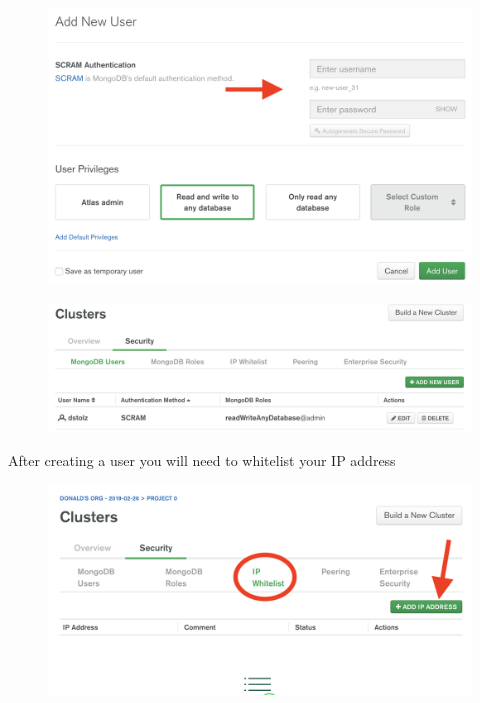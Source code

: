 \documentclass{42-en}
\begin{document}
\begin{figure}[H]
    \begin{center}
        \includegraphics[width=14cm]{WEB/mongo_6.png}
    \end{center}
\end{figure}

\begin{figure}[H]
    \begin{center}
        \includegraphics[width=14cm]{WEB/mongo_7.png}
    \end{center}
\end{figure}

\newpage
After creating a user you will need to whitelist your IP address
\begin{figure}[H]
    \begin{center}
        \includegraphics[width=14cm]{WEB/mongo_8.png}
    \end{center}
\end{figure}
\end{document}
